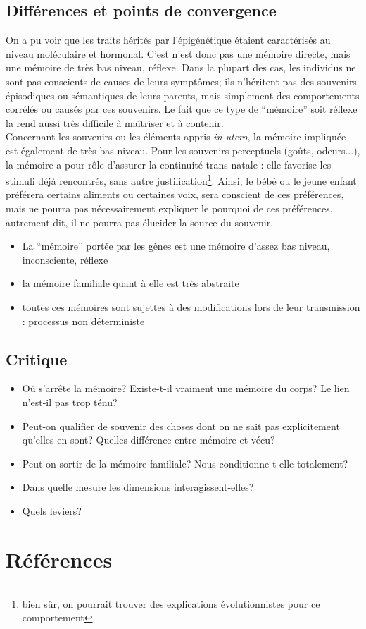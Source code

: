 \documentclass[french]{article}
\begin{document}
		\subsection{Différences et points de convergence}
			On a pu voir que les traits hérités par l'épigénétique étaient caractérisés au niveau moléculaire et hormonal. C'est n'est donc pas une mémoire directe, mais une mémoire de très bas niveau, réflexe. Dans la plupart des cas, les individus ne sont pas conscients de causes de leurs symptômes; ils n'héritent pas des souvenirs épisodiques ou sémantiques de leurs parents, mais simplement des comportements corrélés ou causés par ces souvenirs. Le fait que ce type de ``mémoire'' soit réflexe la rend aussi très difficile à maîtriser et à contenir. \\
			
			Concernant les souvenirs ou les éléments appris \textit{in utero}, la mémoire impliquée est également de très bas niveau. Pour les souvenirs perceptuels (goûts, odeurs...), la mémoire a pour rôle d'assurer la continuité trans-natale : elle favorise les stimuli déjà rencontrés, sans autre justification\footnote{bien sûr, on pourrait trouver des explications évolutionnistes pour ce comportement}. Ainsi, le bébé ou le jeune enfant préférera certains aliments ou certaines voix, sera conscient de ces préférences, mais ne pourra pas nécessairement expliquer le pourquoi de ces préférences, autrement dit, il ne pourra pas élucider la source du souvenir. \\
			
			
			
			
		\begin{itemize}
			\item La ``mémoire'' portée par les gènes est une mémoire d'assez bas niveau, inconsciente, réflexe
			\item la mémoire familiale quant à elle est très abstraite
			\item toutes ces mémoires sont sujettes à des modifications lors de leur transmission : processus non déterministe
		\end{itemize}
		\subsection{Critique}
		\begin{itemize}
			\item Où s'arrête la mémoire? Existe-t-il vraiment une mémoire du corps? Le lien n'est-il pas trop ténu?
			\item Peut-on qualifier de souvenir des choses dont on ne sait pas explicitement qu'elles en sont? Quelles différence entre mémoire et vécu?
			\item Peut-on sortir de la mémoire familiale? Nous conditionne-t-elle totalement?
			\item Dans quelle mesure les dimensions interagissent-elles?
			\item Quels leviers?
		\end{itemize}
	\newpage
	\section*{Références}
	\printbibliography[heading=main, keyword=main]
	\printbibliography[heading=minor, keyword=minor]
	\nocite{*}
\end{document}
